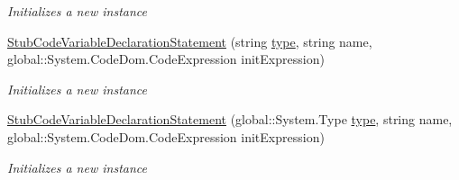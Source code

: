 \begin{DoxyCompactItemize}
\begin{DoxyCompactList}\small\item\em Initializes a new instance\end{DoxyCompactList}\item 
\hyperlink{class_system_1_1_code_dom_1_1_fakes_1_1_stub_code_variable_declaration_statement_aee6498ad25ca138793ace33f052fedff}{Stub\-Code\-Variable\-Declaration\-Statement} (string \hyperlink{jquery-1_810_82-vsdoc_8js_a3940565e83a9bfd10d95ffd27536da91}{type}, string name, global\-::\-System.\-Code\-Dom.\-Code\-Expression init\-Expression)
\begin{DoxyCompactList}\small\item\em Initializes a new instance\end{DoxyCompactList}\item 
\hyperlink{class_system_1_1_code_dom_1_1_fakes_1_1_stub_code_variable_declaration_statement_acc3401b1b1be0d28933b3d2b6a499509}{Stub\-Code\-Variable\-Declaration\-Statement} (global\-::\-System.\-Type \hyperlink{jquery-1_810_82-vsdoc_8js_a3940565e83a9bfd10d95ffd27536da91}{type}, string name, global\-::\-System.\-Code\-Dom.\-Code\-Expression init\-Expression)
\begin{DoxyCompactList}\small\item\em Initializes a new instance\end{DoxyCompactList}\end{DoxyCompactItemize}
